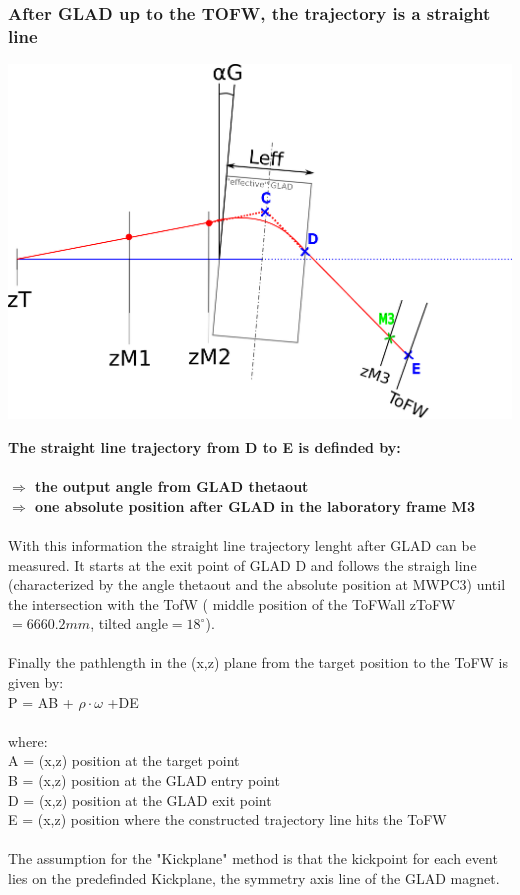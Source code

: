 \documentclass[12pt, letterpaper]{article}
\begin{document}
\subsubsection{After GLAD up to the TOFW, the trajectory is a straight line}
\begin{center}
	\includegraphics[width=1.0\textwidth]{tracking_downstreamGLAD.png}
\end{center}
\textbf{The straight line trajectory from D to E is definded by:}\\
\\
\textbf{$\Rightarrow$ the output angle from GLAD theta\textunderscore out}\\
\textbf{$\Rightarrow$ one absolute position after GLAD in the laboratory frame M3}\\
\\
With this information the straight line trajectory lenght after GLAD can be measured. It starts at the exit point of GLAD D and follows the straigh line (characterized by the angle theta\textunderscore out and the absolute position at MWPC3) until the intersection with the TofW ( middle position of the ToFWall zToFW$=6660.2 mm$, tilted angle$=18^{\circ}$).\\
\\
Finally the pathlength in the (x,z) plane from the target position to the ToFW is given by:\\
P = AB + $\rho\cdot\omega$ +DE\\
\\
where:\\
A = (x,z) position at the target point \\
B = (x,z) position at the GLAD entry point\\
D = (x,z) position at the GLAD exit point\\
E = (x,z) position where the constructed trajectory line hits the ToFW\\
\\
The assumption for the "Kickplane" method is that the kickpoint for each event lies on the predefinded Kickplane, the symmetry axis line of the GLAD magnet. 
\end{document}
